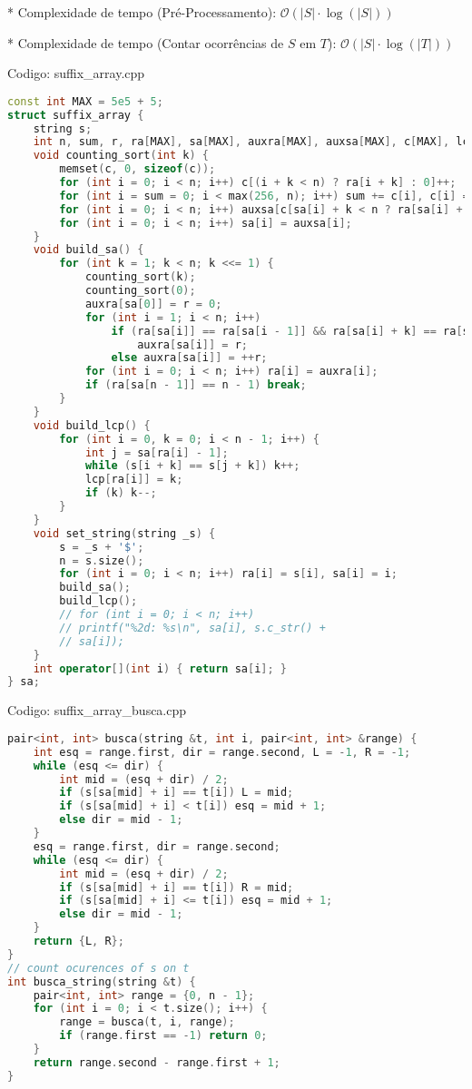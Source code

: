 \documentclass[10pt, a4paper, oneside]{book}
\begin{document}
* Complexidade de tempo (Pré-Processamento): $\mathcal{O}(|S| \cdot \log(|S|))$

* Complexidade de tempo (Contar ocorrências de $S$ em $T$): $\mathcal{O}(|S| \cdot \log(|T|))$

\hfill

Codigo: suffix\_array.cpp

\begin{lstlisting}[language=C++]
const int MAX = 5e5 + 5;
struct suffix_array {
    string s;
    int n, sum, r, ra[MAX], sa[MAX], auxra[MAX], auxsa[MAX], c[MAX], lcp[MAX];
    void counting_sort(int k) {
        memset(c, 0, sizeof(c));
        for (int i = 0; i < n; i++) c[(i + k < n) ? ra[i + k] : 0]++;
        for (int i = sum = 0; i < max(256, n); i++) sum += c[i], c[i] = sum - c[i];
        for (int i = 0; i < n; i++) auxsa[c[sa[i] + k < n ? ra[sa[i] + k] : 0]++] = sa[i];
        for (int i = 0; i < n; i++) sa[i] = auxsa[i];
    }
    void build_sa() {
        for (int k = 1; k < n; k <<= 1) {
            counting_sort(k);
            counting_sort(0);
            auxra[sa[0]] = r = 0;
            for (int i = 1; i < n; i++)
                if (ra[sa[i]] == ra[sa[i - 1]] && ra[sa[i] + k] == ra[sa[i - 1] + k])
                    auxra[sa[i]] = r;
                else auxra[sa[i]] = ++r;
            for (int i = 0; i < n; i++) ra[i] = auxra[i];
            if (ra[sa[n - 1]] == n - 1) break;
        }
    }
    void build_lcp() {
        for (int i = 0, k = 0; i < n - 1; i++) {
            int j = sa[ra[i] - 1];
            while (s[i + k] == s[j + k]) k++;
            lcp[ra[i]] = k;
            if (k) k--;
        }
    }
    void set_string(string _s) {
        s = _s + '$';
        n = s.size();
        for (int i = 0; i < n; i++) ra[i] = s[i], sa[i] = i;
        build_sa();
        build_lcp();
        // for (int i = 0; i < n; i++)
        // printf("%2d: %s\n", sa[i], s.c_str() +
        // sa[i]);
    }
    int operator[](int i) { return sa[i]; }
} sa;
\end{lstlisting}
\hfill

Codigo: suffix\_array\_busca.cpp

\begin{lstlisting}[language=C++]
pair<int, int> busca(string &t, int i, pair<int, int> &range) {
    int esq = range.first, dir = range.second, L = -1, R = -1;
    while (esq <= dir) {
        int mid = (esq + dir) / 2;
        if (s[sa[mid] + i] == t[i]) L = mid;
        if (s[sa[mid] + i] < t[i]) esq = mid + 1;
        else dir = mid - 1;
    }
    esq = range.first, dir = range.second;
    while (esq <= dir) {
        int mid = (esq + dir) / 2;
        if (s[sa[mid] + i] == t[i]) R = mid;
        if (s[sa[mid] + i] <= t[i]) esq = mid + 1;
        else dir = mid - 1;
    }
    return {L, R};
}
// count ocurences of s on t
int busca_string(string &t) {
    pair<int, int> range = {0, n - 1};
    for (int i = 0; i < t.size(); i++) {
        range = busca(t, i, range);
        if (range.first == -1) return 0;
    }
    return range.second - range.first + 1;
}\end{lstlisting}
\hfill
\end{document}
